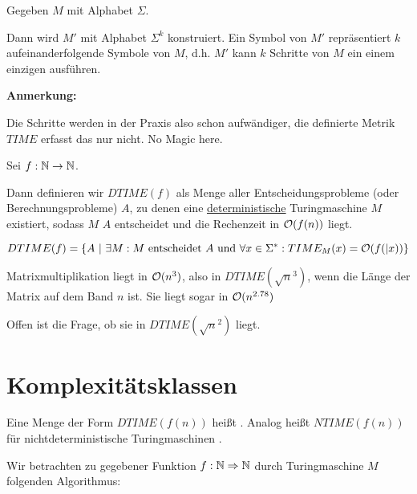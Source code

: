\begin{beweis}
    Gegeben $M$ mit Alphabet $\Sigma$.

    Dann wird $M'$ mit Alphabet $\Sigma^k$ konstruiert. Ein Symbol von $M'$ repräsentiert $k$ aufeinanderfolgende Symbole von $M$, d.h. $M'$ kann $k$ Schritte von $M$ ein einem einzigen ausführen.
\end{beweis}

\textbf{Anmerkung:}

Die Schritte werden in der Praxis also schon aufwändiger, die definierte Metrik $TIME$ erfasst das nur nicht. No Magic here.



\begin{definition}
    Sei $f: \mathbb{N} \rightarrow \mathbb{N}$. 

    Dann definieren wir $DTIME(f)$ als Menge aller Entscheidungsprobleme (oder Berechnungsprobleme) $A$, zu denen eine \underline{deterministische} Turingmaschine $M$ existiert, sodass $M$ $A$ entscheidet und die Rechenzeit in $\mathcal{O}(f(n))$ liegt.

    $$ DTIME(f) = \{  
        A 
        \ |\ 
        \exists M: 
            M \text{ entscheidet } A
            \text{ und }
            \forall x \in \Sigma^\ast: TIME_M(x) = \bigO(f(|x))
    \}
    $$
\end{definition}

\begin{satz}
    Matrixmultiplikation liegt in $\mathcal{O}(n^3)$, also in $DTIME(\sqrt{n}^3)$, wenn die Länge der Matrix auf dem Band $n$ ist.
    Sie liegt sogar in $\mathcal{O}(n^{2.78})$
\end{satz}

Offen ist die Frage, ob sie in $DTIME(\sqrt{n}^2)$ liegt.



\section{Komplexitätsklassen}


\begin{definition}
    Eine Menge der Form $DTIME(f(n))$ heißt .
    Analog heißt $NTIME(f(n))$ für nichtdeterministische Turingmaschinen .
\end{definition}


Wir betrachten zu gegebener Funktion $f: \mathbb{N} \Rightarrow \mathbb{N}$ durch Turingmaschine $M$ folgenden Algorithmus:

